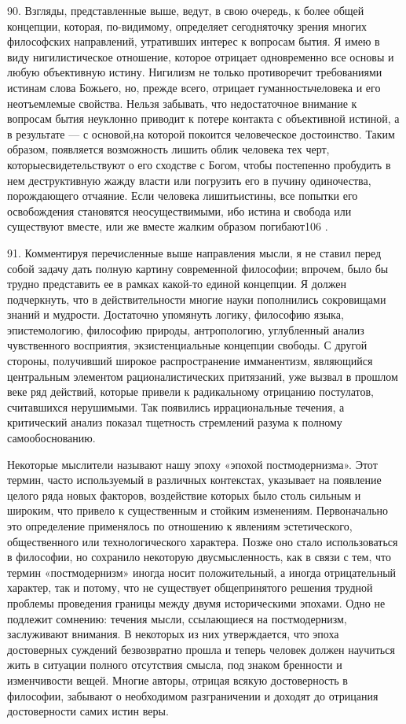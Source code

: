 \documentclass[a5paper,10pt]{article}
\begin{document}
90. Взгляды, представленные выше, ведут, в свою очередь, к более общей
концепции, которая, по-видимому, определяет сегодняточку зрения многих
философских направлений, утративших интерес к вопросам бытия. Я имею в виду
нигилистическое отношение, которое отрицает одновременно все основы и любую
объективную истину. Нигилизм не только противоречит требованиями истинам слова
Божьего, но, прежде всего, отрицает гуманностьчеловека и его неотъемлемые
свойства. Нельзя забывать, что недостаточное внимание к вопросам бытия
неуклонно приводит к потере контакта с объективной истиной, а в результате — с
основой,на которой покоится человеческое достоинство. Таким образом, появляется
возможность лишить облик человека тех черт, которыесвидетельствуют о его
сходстве с Богом, чтобы постепенно пробудить в нем деструктивную жажду власти
или погрузить его в пучину одиночества, порождающего отчаяние. Если человека
лишитьистины, все попытки его освобождения становятся неосуществимыми, ибо
истина и свобода или существуют вместе, или же вместе жалким образом
погибают106 .

91. Комментируя перечисленные выше направления мысли, я не ставил перед собой
задачу дать полную картину современной философии; впрочем, было бы трудно
представить ее в рамках какой-то единой концепции. Я должен подчеркнуть, что в
действительности многие науки пополнились сокровищами знаний и мудрости.
Достаточно упомянуть логику, философию языка, эпистемологию, философию природы,
антропологию, углубленный анализ чувственного восприятия, экзистенциальные
концепции свободы. С другой стороны, получивший широкое распространение
имманентизм, являющийся центральным элементом рационалистических притязаний,
уже вызвал в прошлом веке ряд действий, которые привели к радикальному
отрицанию постулатов, считавшихся нерушимыми. Так появились иррациональные
течения, а критический анализ показал тщетность стремлений разума к полному
самообоснованию.

Некоторые мыслители называют нашу эпоху «эпохой постмодернизма». Этот термин,
часто используемый в различных контекстах, указывает на появление целого ряда
новых факторов, воздействие которых было столь сильным и широким, что привело к
существенным и стойким изменениям. Первоначально это определение применялось по
отношению к явлениям эстетического, общественного или технологического
характера. Позже оно стало использоваться в философии, но сохранило некоторую
двусмысленность, как в связи с тем, что термин «постмодернизм» иногда носит
положительный, а иногда отрицательный характер, так и потому, что не существует
общепринятого решения трудной проблемы проведения границы между двумя
историческими эпохами. Одно не подлежит сомнению: течения мысли, ссылающиеся на
постмодернизм, заслуживают внимания. В некоторых из них утверждается, что эпоха
достоверных суждений безвозвратно прошла и теперь человек должен научиться жить
в ситуации полного отсутствия смысла, под знаком бренности и изменчивости
вещей. Многие авторы, отрицая всякую достоверность в философии, забывают о
необходимом разграничении и доходят до отрицания достоверности самих истин
веры.
\end{document}
